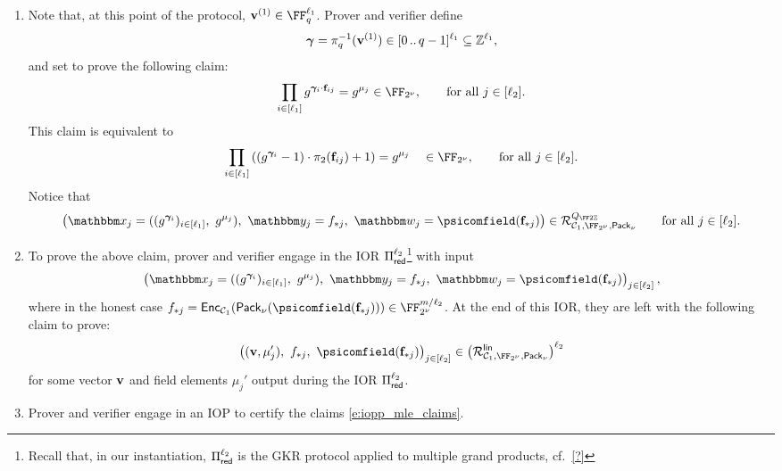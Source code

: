 \documentclass[11pt,letterpaper,usenames,dvipsnames]{article}
\begin{document}
\begin{construction}
\begin{enumerate}[leftmargin=*]
\item Note that, at this point of the protocol, $\vv^{(1)}\in \FF_q^{\codedim_1}$. 
Prover and verifier define $$\bm{\gamma} = \pi_{q}^{-1}(\mathbf{v}^{(1)}) \in [0 \, .. \, q-1]^{\ell_1}\subseteq \mathbb{Z}^{\ell_1},$$ and set to prove the following claim:
%
$$
\prod_{i \in [\codedim_1]} g^{\bm{\gamma}_i\cdot \bff_{ij}}  = g^{\mu_j} \in \comfield, \qquad \text{for all } j\in [\codedim_2].
$$
This claim is equivalent to
$$
\prod_{i \in [\codedim_1]} \left(\left(g^{\bm{\gamma}_i}-1\right)\cdot \pi_2(\bff_{ij}) +1\right)= g^{\mu_j}  \quad  \in \comfield, \qquad \text{for all } j\in [\codedim_2].
$$
Notice that \begin{equation}\label{e:Q_F2Z_intermediate}\left(\inp_j=((g^{\bm{\gamma}_i})_{i \in [\codedim_1]},\ g^{\mu_j}),\  \oracle_j= f_{*j}, \ \wit_j=\psicomfield(\bff_{*j})\right)\in \Relation^{Q_{\FF2\ZZ}}_{\cC_1,\comfield,\pack} \qquad \text{for all } j\in [\ell_2].
\end{equation}
\item To prove the above claim, prover and verifier engage in the IOR $\Pi_{\mathsf{red}}^{\ell_2}$\footnote{Recall that, in our instantiation, $\Pi_{\mathsf{red}}^{\ell_2}$ is the GKR protocol applied to multiple grand products, cf.\ \cref{?}}   with input $$\left(\inp_j=((g^{\bm{\gamma}_i})_{i \in [\codedim_1]},\ g^{\mu_j}),\  \oracle_j= f_{*j}, \ \wit_j=\psicomfield(\bff_{*j})\right)_{j\in [\codedim_2]},$$
%
where in the honest case  $f_{*j} = \Enc_{\cC_1}(\pack(\psicomfield(\bff_{*j})))\in \comfield^{\codelength/\codedim_2}$.
%
 At the end of this IOR, they are left with the following claim to prove: 
%
\begin{equation}\label{e:iopp_mle_claims}
\left((\vv, \mu_j'), \ f_{*j}, \ \psicomfield(\bff_{*j})\right)_{j\in [\codedim_2]} \in \left(\Relation^{\mathsf{lin}}_{\cC_1, \comfield,\pack}\right)^{\codedim_2}\end{equation} for some vector $\mathbf{v}$ and field elements $\mu_j'$ output during the IOR $\Pi_{\mathsf{red}}^{\ell_2}$. 
\item Prover and  verifier engage in an IOP  to certify the claims \eqref{e:iopp_mle_claims}. 
\end{enumerate}
\end{construction}
\end{document}
